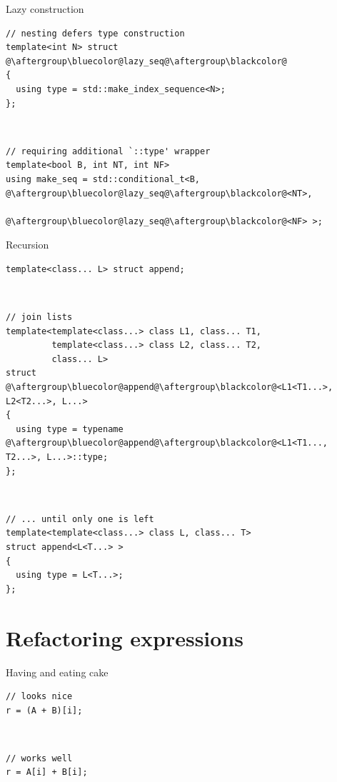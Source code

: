 \documentclass[xcolor=dvipsnames]{beamer}
\begin{document}
\begin{frame}[fragile]{Lazy construction}
\begin{lstlisting}
// nesting defers type construction
template<int N> struct @\aftergroup\bluecolor@lazy_seq@\aftergroup\blackcolor@
{
  using type = std::make_index_sequence<N>;
};
\end{lstlisting}

~

\begin{lstlisting}
// requiring additional `::type' wrapper
template<bool B, int NT, int NF>
using make_seq = std::conditional_t<B, @\aftergroup\bluecolor@lazy_seq@\aftergroup\blackcolor@<NT>,
                                       @\aftergroup\bluecolor@lazy_seq@\aftergroup\blackcolor@<NF> >;
\end{lstlisting}
\end{frame}


\begin{frame}[fragile]{Recursion}
\begin{lstlisting}
template<class... L> struct append;
\end{lstlisting}

~

\begin{lstlisting}
// join lists
template<template<class...> class L1, class... T1,
         template<class...> class L2, class... T2,
         class... L>
struct @\aftergroup\bluecolor@append@\aftergroup\blackcolor@<L1<T1...>, L2<T2...>, L...>
{
  using type = typename @\aftergroup\bluecolor@append@\aftergroup\blackcolor@<L1<T1..., T2...>, L...>::type;
};
\end{lstlisting}

~

\begin{lstlisting}
// ... until only one is left
template<template<class...> class L, class... T>
struct append<L<T...> >
{
  using type = L<T...>;
};
\end{lstlisting}
\end{frame}


\section{Refactoring expressions}


\begin{frame}[fragile]{Having and eating cake}
\begin{lstlisting}
// looks nice
r = (A + B)[i];
\end{lstlisting}

~

\begin{lstlisting}
// works well
r = A[i] + B[i];
\end{lstlisting}
\end{frame}
\end{document}
